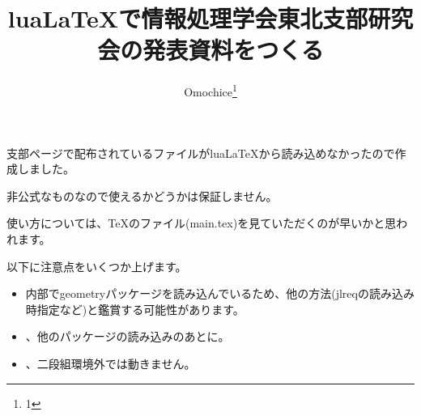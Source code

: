 \documentclass[twocolumn,paper=a4paper,landscape,fontsize=9pt]{jlreq}
\title{luaLaTeXで情報処理学会東北支部研究会の発表資料をつくる}
\author{Omochice\thanks{1}}
\begin{document}

\maketitle

支部ページ\cite{ipsjTohoku}で配布されているファイルがluaLaTeXから読み込めなかったので作成しました。

非公式なものなので使えるかどうかは保証しません。

使い方については、TeXのファイル(main.tex)を見ていただくのが早いかと思われます。

以下に注意点をいくつか上げます。

\begin{itemize}
  \item 内部でgeometryパッケージを読み込んでいるため、他の方法(jlreqの読み込み時指定など)と鑑賞する可能性があります。
  \item \string{}\string{}、他のパッケージの読み込みのあとに\string{}。
  \item \string{}、二段組環境外では動きません。
\end{itemize}


\printbibliography[title=参考文献]
\end{document}
